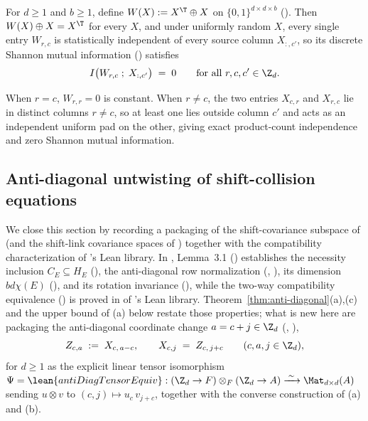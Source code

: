 \begin{proposition}\label{prop:otp-control}
For $d \ge 1$ and $b \ge 1$, define $W(X) := X^{\T} \oplus X$ on $\{0,1\}^{d\times d\times b}$
(). Then $W(X) \oplus X = X^{\T}$ for every $X$, and under uniformly random $X$,
every single entry $W_{r,c}$ is statistically independent of every source column $X_{:, c'}$, so its
discrete Shannon mutual information () satisfies
\[
  I\bigl(W_{r,c}\;;\; X_{:,c'}\bigr) \;=\; 0
  \qquad
  \text{for all } r, c, c' \in \Z_d.
\]
\end{proposition}
\begin{outline}
When $r = c$, $W_{r,r} = 0$ is constant. When $r \ne c$, the two entries $X_{c,r}$ and $X_{r,c}$ lie
in distinct columns $r \ne c$, so at least one lies outside column $c'$ and acts as an independent
uniform pad on the other, giving exact product-count independence and zero Shannon mutual
information.
\end{outline}

\subsection{Anti-diagonal untwisting of shift-collision equations}\label{sec:antidiag}

We close this section by recording a  packaging of the shift-covariance
subspace of \cite[Lemma~3.1]{SharedDecoders2026} (and the shift-link covariance spaces of
\cite[Section~6]{SeventeenthPaper2026}) together with the compatibility characterization of
\cite{SharedDecoders2026}'s Lean library. In \cite{SharedDecoders2026}, Lemma~3.1
() establishes the necessity inclusion $C_E \subseteq H_E$
(), the anti-diagonal row
normalization (, ),
its dimension $bd\chi(E)$ (), and its rotation
invariance (), while the two-way compatibility
equivalence () is proved in
 of \cite{SharedDecoders2026}'s Lean library.
Theorem~\ref{thm:anti-diagonal}(a),(c)
and the upper bound of (a) below restate those properties; what is new here
are packaging the anti-diagonal coordinate change $a = c + j \in \Z_d$ (,
),
\[
  Z_{c,a} \;:=\; X_{c,\,a - c},
  \qquad
  X_{c,j} \;=\; Z_{c,\,j + c}
  \qquad (c, a, j \in \Z_d),
\]
for $d \ge 1$ as the explicit linear tensor isomorphism
$\Psi = \lean{antiDiagTensorEquiv} : (\Z_d \to F) \otimes_F (\Z_d \to A) \xrightarrow{\;\sim\;}
\Mat_{d\times d}(A)$ sending $u \otimes v$ to $(c, j) \mapsto u_c\,v_{j+c}$, together with the
converse construction of (a) and (b).

